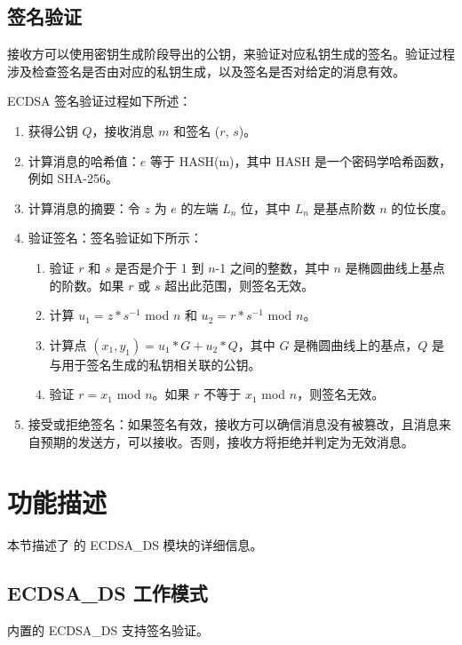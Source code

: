 \documentclass[main\_\_CN.tex]{subfiles}
\begin{document}
\subsection{签名验证}

接收方可以使用密钥生成阶段导出的公钥，来验证对应私钥生成的签名。验证过程涉及检查签名是否由对应的私钥生成，以及签名是否对给定的消息有效。

ECDSA 签名验证过程如下所述：

\begin{enumerate}
    \item 获得公钥 $Q$，接收消息 $m$ 和签名 ($r$, $s$)。
    \item 计算消息的哈希值：$e$ 等于 HASH(m)，其中 HASH 是一个密码学哈希函数，例如 SHA-256。
    \item 计算消息的摘要：令 $z$ 为 $e$ 的左端 $L_n$ 位，其中 $L_n$ 是基点阶数 $n$ 的位长度。
    \item 验证签名：签名验证如下所示：
        \begin{enumerate}
            \item 验证 $r$ 和 $s$ 是否是介于 1 到 $n$-1 之间的整数，其中 $n$ 是椭圆曲线上基点的阶数。如果 $r$ 或 $s$ 超出此范围，则签名无效。
            \item 计算 $u_1 = z * s^{-1}$ \textrm{mod} $n$ 和 $u_2 = r * s^{-1}$ \textrm{mod} $n$。
            \item 计算点 $(x_1, y_1) = u_1 * G + u_2 * Q$，其中 $G$ 是椭圆曲线上的基点，$Q$ 是与用于签名生成的私钥相关联的公钥。
            \item 验证 $r = x_1$ \textrm{mod} $n$。如果 $r$ 不等于 $x_1$ \textrm{mod} $n$，则签名无效。
        \end{enumerate}
    \item 接受或拒绝签名：如果签名有效，接收方可以确信消息没有被篡改，且消息来自预期的发送方，可以接收。否则，接收方将拒绝并判定为无效消息。
\end{enumerate}


\section{功能描述}

本节描述了 \chipname{} 的 ECDSA\_DS 模块的详细信息。

\subsection{ECDSA\_DS 工作模式}

\chipname{} 内置的 ECDSA\_DS 支持签名验证。
\end{document}
